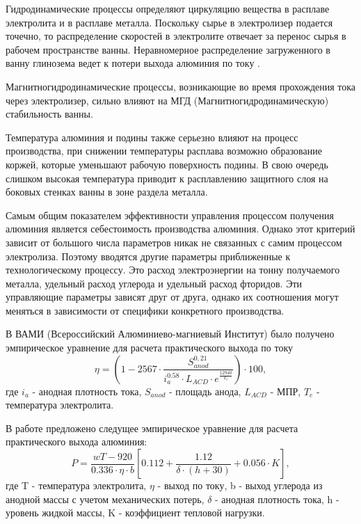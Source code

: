 \documentclass{article}
\begin{document}
Гидродинамические процессы определяют циркуляцию вещества в расплаве электролита и в расплаве металла. Поскольку сырье в электролизер подается точечно, то распределение скоростей в электролите отвечает за перенос сырья в рабочем пространстве ванны. Неравномерное распределение загруженного в ванну глинозема ведет к потери выхода алюминия по току \cite{litink:AE}.

Магнитногидродинамические процессы, возникающие во время прохождения тока через электролизер, сильно влияют на МГД (Магнитногидродинамическую) стабильность ванны. 

Температура алюминия и подины также серьезно влияют на процесс производства, при снижении температуры расплава возможно образование коржей, которые уменьшают рабочую поверхность подины. В свою очередь слишком высокая температура приводит к расплавлению защитного слоя на боковых стенках ванны в зоне раздела металла.

Самым общим показателем эффективности управления процессом получения алюминия является себестоимость производства алюминия. Однако этот критерий зависит от большого числа параметров никак не связанных с самим процессом электролиза. Поэтому вводятся другие параметры приближенные к технологическому процессу. Это расход электроэнергии на тонну получаемого металла, удельный расход углерода и удельный расход фторидов. Эти управляющие параметры зависят друг от друга, однако их соотношения могут меняться в зависимости от специфики конкретного производства.

В ВАМИ (Всероссийский Алюминиево-магниевый Институт) было получено эмпирическое уравнение для расчета практического выхода по току \cite{litlink:VAMI}
\begin{equation} \label{eq1}
\eta=(1-2567 \cdot \frac{S^{0,21}_{anod}}{i^{0.58}_a \cdot L_{ACD} \cdot e^{\frac{12940}{T_e}}}) \cdot 100,
\end{equation}
где $i_a$ - анодная плотность тока, $S_{anod}$ - площадь анода, $L_{ACD}$ - МПР, $T_e$ - температура электролита.

В работе \cite{litlink:korobov} предложено следущее эмпирическое уравнение для расчета практического выхода алюминия:
\begin{equation} \label{eq:p}
P= \frac{wT-920}{0.336 \cdot \eta \cdot b}[0.112+\frac {1.12}{\delta \cdot (h+30)}+0.056 \cdot K],
\end{equation}
где T - температура электролита, $\eta$ - выход по току, b - выход углерода из анодной массы с учетом механических потерь, $\delta$ - анодная плотность тока, h - уровень жидкой массы, K - коэффициент тепловой нагрузки.
\end{document}
